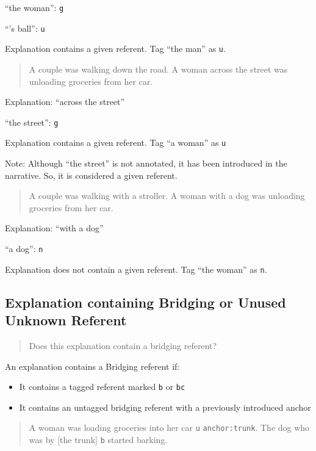 \documentclass[
]{book}
\providecommand{\tightlist}{%
  \setlength{\itemsep}{0pt}\setlength{\parskip}{0pt}}
\begin{document}
``the woman'': \texttt{g}

``'s ball'': \texttt{u}

Explanation contains a given referent.
Tag ``the man'' as \texttt{u}.

\begin{quote}
A couple was walking down the road.
A woman across the street was unloading groceries from her car.
\end{quote}

Explanation: ``across the street''

``the street'': \texttt{g}

Explanation contains a given referent.
Tag ``a woman'' as \texttt{u}

Note: Although ``the street'' is not annotated, it has been introduced in the narrative.
So, it is considered a given referent.

\begin{quote}
A couple was walking with a stroller.
A woman with a dog was unloading groceries from her car.
\end{quote}

Explanation: ``with a dog''

``a dog'': \texttt{n}

Explanation does not contain a given referent.
Tag ``the woman'' as \texttt{n}.

\hypertarget{explanation-containing-bridging-or-unused-unknown-referent}{%
\subsection{Explanation containing Bridging or Unused Unknown Referent}\label{explanation-containing-bridging-or-unused-unknown-referent}}

\begin{quote}
Does this explanation contain a bridging referent?
\end{quote}

An explanation contains a Bridging referent if:

\begin{itemize}
\tightlist
\item
  It contains a tagged referent marked \texttt{b} or \texttt{bc}
\item
  It contains an untagged bridging referent with a previously introduced anchor
\end{itemize}

\begin{quote}
A woman was loading groceries into her car \texttt{u} \texttt{anchor:trunk}.
The dog who was by {[}the trunk{]} \texttt{b} started barking.
\end{quote}
\end{document}

